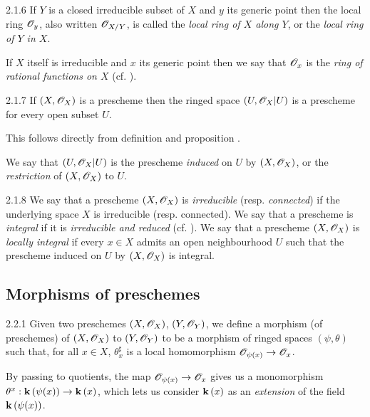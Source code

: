 \begin{env}{2.1.6}
\label{env-1.2.1.6}
If $Y$ is a closed irreducible subset of $X$ and $y$ its
generic point then the local ring $\mathscr{O}_y$, also written $\mathscr{O}_{X/Y}$, is called the
\emph{local ring of $X$ along $Y$}, or the \emph{local ring of $Y$ in $X$}.

If $X$ itself is irreducible and $x$ its generic point then we say that
$\mathscr{O}_x$ is the \emph{ring of rational functions on $X$} (cf. ).
\end{env}

\begin{envs}[Proposition]{2.1.7}
\label{prop-1.2.1.7}
If $(X,\mathscr{O}_X)$ is a prescheme then the ringed
space $(U,\mathscr{O}_X|U)$ is a prescheme for every open subset $U$.
\end{envs}

This follows directly from definition  and proposition .

We say that $(U,\mathscr{O}_X|U)$ is the prescheme \emph{induced} on $U$ by
$(X,\mathscr{O}_X)$, or the \emph{restriction} of $(X,\mathscr{O}_X)$ to $U$.

\begin{env}{2.1.8}
\label{env-1.2.1.8}
We say that a prescheme $(X,\mathscr{O}_X)$ is \emph{irreducible}
(resp. \emph{connected}) if the underlying space $X$ is irreducible (resp.
connected).  We say that a prescheme is \emph{integral} if it is
\emph{irreducible and reduced} (cf. ).  We say that a prescheme
$(X,\mathscr{O}_X)$ is \emph{locally integral} if every $x\in X$ admits an open
neighbourhood $U$ such that the prescheme induced on $U$ by $(X,\mathscr{O}_X)$ is
integral.
\end{env}

\subsection{Morphisms of preschemes}
\label{1-schemes-2.2}

\begin{envs}[Definition]{2.2.1}
\label{defn-1.2.2.1}
Given two preschemes $(X,\mathscr{O}_X)$, $(Y,\mathscr{O}_Y)$, we
define a morphism (of preschemes) of $(X,\mathscr{O}_X)$ to $(Y,\mathscr{O}_Y)$ to be a morphism
of ringed spaces $(\psi,\theta)$ such that, for all $x\in X$, $\theta_x^\sharp$ is a
local homomorphism $\mathscr{O}_{\psi(x)}\to\mathscr{O}_x$.
\end{envs}

By passing to quotients, the map $\mathscr{O}_{\psi(x)}\to\mathscr{O}_x$ gives us a monomorphism
$\theta^x:\mathbf{k}\,(\psi(x))\to\mathbf{k}\,(x)$, which lets us consider $\mathbf{k}\,(x)$ as an
\emph{extension} of the field $\mathbf{k}\,(\psi(x))$.

